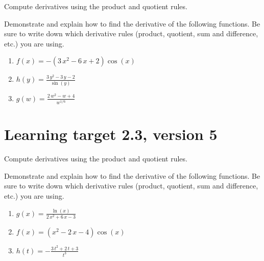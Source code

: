 Compute derivatives using the product and quotient rules.

\hrulefill

Demonstrate and explain how to find the derivative of the following functions. Be sure to write down which derivative rules (product, quotient, sum and difference, etc.) you are using.

\begin{enumerate}
    \item \(\renewcommand{\log}{\ln} f(x)= -{\left(3 \, x^{2} - 6 \, x + 2\right)} \cos\left(x\right)\)
    \vfill
    \item \(\renewcommand{\log}{\ln} h(y)= \frac{3 \, y^{2} - 3 \, y - 2}{\sin\left(y\right)}\)
    \vfill
    \item \(\renewcommand{\log}{\ln} g(w)= \frac{2 \, w^{2} - w + 4}{w^{1/6}}\)
    \vfill
\end{enumerate}

\pagebreak

\section{Learning target 2.3, version 5}

Compute derivatives using the product and quotient rules.

\hrulefill

Demonstrate and explain how to find the derivative of the following functions. Be sure to write down which derivative rules (product, quotient, sum and difference, etc.) you are using.

\begin{enumerate}
    \item \(\renewcommand{\log}{\ln} g(x)= \frac{\log\left(x\right)}{2 \, x^{2} + 6 \, x - 3}\)
    \vfill
    \item \(\renewcommand{\log}{\ln} f(x)= {\left(x^{2} - 2 \, x - 4\right)} \cos\left(x\right)\)
    \vfill
    \item \(\renewcommand{\log}{\ln} h(t)= -\frac{3 \, t^{2} + 2 \, t + 3}{t^{3}}\)
    \vfill
\end{enumerate}



\pagebreak

